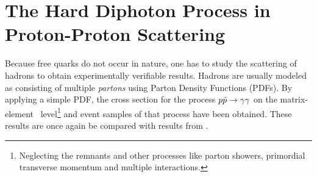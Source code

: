 \chapter{The Hard Diphoton Process in Proton-Proton
  Scattering}%
\label{chap:pdf}

Because free quarks do not occur in nature, one has to study the
scattering of hadrons to obtain experimentally verifiable
results. Hadrons are usually modeled as consisting of multiple
\emph{partons} using Parton Density Functions (PDFs). By applying a
simple PDF, the cross section for the process \(p\bar{p}\rightarrow\gamma\gamma\) on the
matrix-element~\cite[14]{buckley:2011ge} level\footnote{Neglecting the
  remnants and other processes like parton showers, primordial
  transverse momentum and multiple interactions.} and event samples of
that process have been obtained. These results are once again be
compared with results from \sherpa.

